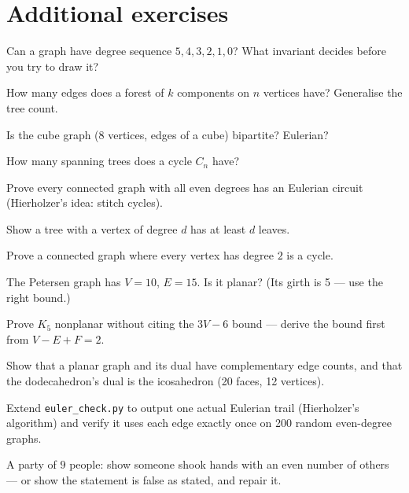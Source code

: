 \section{Additional exercises}
\begin{exercise}[easy]
Can a graph have degree sequence $5,4,3,2,1,0$? What invariant decides
before you try to draw it?
\end{exercise}
\begin{exercise}[easy]
How many edges does a forest of $k$ components on $n$ vertices have?
Generalise the tree count.
\end{exercise}
\begin{exercise}[easy]
Is the cube graph (8 vertices, edges of a cube) bipartite? Eulerian?
\end{exercise}
\begin{exercise}[easy]
How many spanning trees does a cycle $C_n$ have?
\end{exercise}
\begin{exercise}[medium]
Prove every connected graph with all even degrees has an Eulerian
circuit (Hierholzer's idea: stitch cycles).
\end{exercise}
\begin{exercise}[medium]
Show a tree with a vertex of degree $d$ has at least $d$ leaves.
\end{exercise}
\begin{exercise}[medium]
Prove a connected graph where every vertex has degree $2$ is a cycle.
\end{exercise}
\begin{exercise}[medium]
The Petersen graph has $V=10$, $E=15$. Is it planar? (Its girth is 5 ---
use the right bound.)
\end{exercise}
\begin{exercise}[hard]
Prove $K_5$ nonplanar without citing the $3V-6$ bound --- derive the
bound first from $V-E+F=2$.
\end{exercise}
\begin{exercise}[hard]
Show that a planar graph and its dual have complementary edge counts,
and that the dodecahedron's dual is the icosahedron (20 faces, 12
vertices).
\end{exercise}
\begin{exercise}[hard]
Extend \texttt{euler\_check.py} to output one actual Eulerian trail
(Hierholzer's algorithm) and verify it uses each edge exactly once on
200 random even-degree graphs.
\end{exercise}
\begin{exercise}[easy]
A party of $9$ people: show someone shook hands with an even number of
others --- or show the statement is false as stated, and repair it.
\end{exercise}
